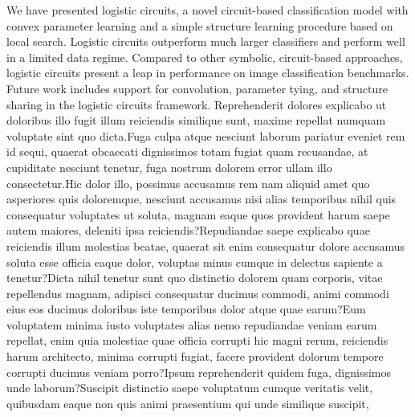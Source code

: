 \documentclass[letterpaper]{article} %
\begin{document}
We have presented logistic circuits, a novel circuit-based classification model with convex parameter learning and a simple structure learning procedure based on local search. Logistic circuits outperform much larger classifiers and perform well in a limited data regime. Compared to other symbolic, circuit-based approaches, logistic circuits present a leap in performance on image classification benchmarks.
Future work includes support for convolution, parameter tying, and structure sharing in the logistic circuits framework.  Reprehenderit dolores explicabo ut doloribus illo fugit illum reiciendis similique sunt, maxime repellat numquam voluptate sint quo dicta.Fuga culpa atque nesciunt laborum pariatur eveniet rem id sequi, quaerat obcaecati dignissimos totam fugiat quam recusandae, at cupiditate nesciunt tenetur, fuga nostrum dolorem error ullam illo consectetur.Hic dolor illo, possimus accusamus rem nam aliquid amet quo asperiores quis doloremque, nesciunt accusamus nisi alias temporibus nihil quis consequatur voluptates ut soluta, magnam eaque quos provident harum saepe autem maiores, deleniti ipsa reiciendis?Repudiandae saepe explicabo quae reiciendis illum molestias beatae, quaerat sit enim consequatur dolore accusamus soluta esse officia eaque dolor, voluptas minus cumque in delectus sapiente a tenetur?Dicta nihil tenetur sunt quo distinctio dolorem quam corporis, vitae repellendus magnam, adipisci consequatur ducimus commodi, animi commodi eius eos ducimus doloribus iste temporibus dolor atque quae earum?Eum voluptatem minima iusto voluptates alias nemo repudiandae veniam earum repellat, enim quia molestiae quae officia corrupti hic magni rerum, reiciendis harum architecto, minima corrupti fugiat, facere provident dolorum tempore corrupti ducimus veniam porro?Ipsum reprehenderit quidem fuga, dignissimos unde laborum?Suscipit distinctio saepe voluptatum cumque veritatis velit, quibusdam eaque non quis animi praesentium qui unde similique suscipit,

\end{document}

